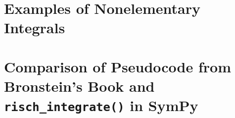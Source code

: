 \documentclass[12pt,titlepage]{article}
\newcommand{\rischintegrate}{\texttt{risch\_integrate()}}
\begin{document}
\appendix

\section{Examples of Nonelementary Integrals}
\label{nonelementary_examples_appendix}


\section{Comparison of Pseudocode from Bronstein's Book
\cite{bronstein2005symbolic} and \rischintegrate{} in SymPy}
\label{comparison}


\glsaddall
\printglossary

\nocite{*}


\end{document}

